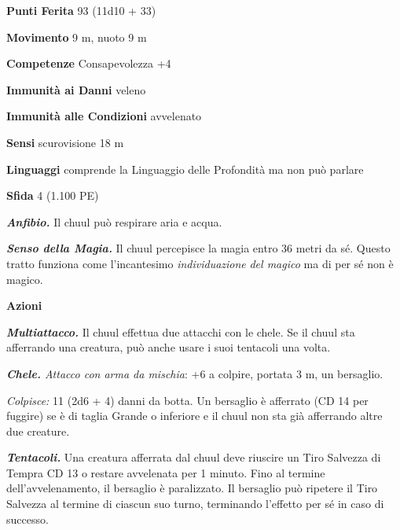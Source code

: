 \begin{multicols}{2}
\textbf{Punti Ferita} 93 (11d10 + 33)

\textbf{Movimento} 9 m, nuoto 9 m

\textbf{Competenze} Consapevolezza +4

\textbf{Immunità ai Danni} veleno

\textbf{Immunità alle Condizioni} avvelenato

\textbf{Sensi} scurovisione 18 m

\textbf{Linguaggi} comprende la Linguaggio delle Profondità ma non può
parlare

\textbf{Sfida} 4 (1.100 PE)

\emph{\textbf{Anfibio.}} Il chuul può respirare aria e acqua.

\emph{\textbf{Senso della Magia.}} Il chuul percepisce la magia entro 36  metri da sé. Questo tratto funziona come l'incantesimo  \emph{individuazione} \emph{del magico} ma di per sé non è magico.  

\textbf{Azioni}

\emph{\textbf{Multiattacco.}} Il chuul effettua due attacchi con le  chele. Se il chuul sta afferrando una creatura, può anche usare i suoi tentacoli una volta.

\emph{\textbf{Chele.} Attacco con arma da mischia}: +6 a colpire,  portata 3 m, un bersaglio.

\emph{Colpisce:} 11 (2d6 + 4) danni da botta. Un bersaglio è  afferrato (CD 14 per fuggire) se è di taglia Grande o inferiore e il  chuul non sta già afferrando altre due creature.

\emph{\textbf{Tentacoli.}} Una creatura afferrata dal chuul deve  riuscire un Tiro Salvezza di Tempra CD 13 o restare avvelenata per  1 minuto. Fino al termine dell'avvelenamento, il bersaglio è  paralizzato. Il bersaglio può ripetere il Tiro Salvezza al termine di  ciascun suo turno, terminando l'effetto per sé in caso di successo.


\end{multicols}
